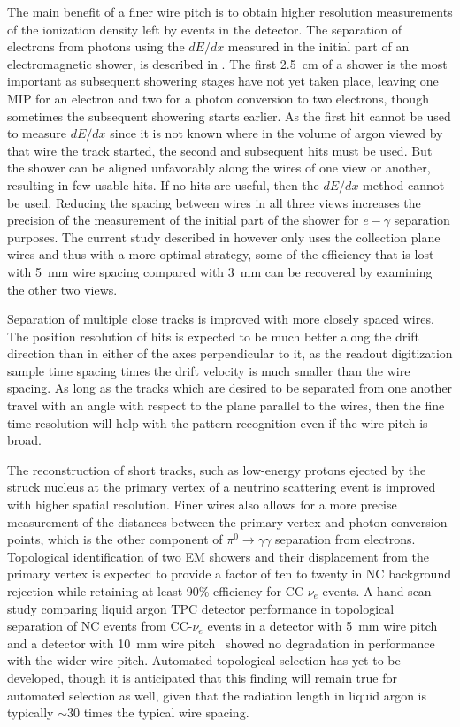 The main benefit of a finer wire pitch is to obtain higher resolution
measurements of the ionization density left by events in the detector.
The separation of electrons from photons using the $dE/dx$ measured in
the initial part of an electromagnetic shower, is described in
\anxreco.  The first 2.5~cm of a shower is the most important as
subsequent showering stages have not yet taken place, leaving one MIP
for an electron and two for a photon conversion to two electrons,
though sometimes the subsequent showering starts earlier.  As the
first hit cannot be used to measure $dE/dx$ since it is not known
where in the volume of argon viewed by that wire the track started,
the second and subsequent hits must be used.  But the shower can be
aligned unfavorably along the wires of one view or another, resulting
in few usable hits.  If no hits are useful, then the $dE/dx$ method
cannot be used.  Reducing the spacing between wires in all three views
increases the precision of the measurement of the initial part of the
shower for $e-\gamma$ separation purposes.  The current study
described in \anxreco however only uses the collection plane wires and
thus with a more optimal strategy, some of the efficiency that is lost
with 5~mm wire spacing compared with 3~mm can be recovered by
examining the other two views.

Separation of multiple close tracks is improved with more closely
spaced wires.  The position resolution of hits is expected to be much
better along the drift direction than in either of the axes
perpendicular to it, as the readout digitization sample time spacing
times the drift velocity is much smaller than the wire spacing.  As
long as the tracks which are desired to be separated from one another
travel with an angle with respect to the plane parallel to the wires,
then the fine time resolution will help with the pattern recognition
even if the wire pitch is broad.

The reconstruction of short tracks, such as low-energy protons ejected
by the struck nucleus at the primary vertex of a neutrino scattering
event is improved with higher spatial resolution.  Finer wires also
allows for a more precise measurement of the distances between the
primary vertex and photon conversion points, which is the other
component of $\pi^0\rightarrow\gamma\gamma$ separation from electrons.
Topological identification of two EM showers and their displacement
from the primary vertex is expected to provide a factor of ten to
twenty in NC background rejection while retaining at least 90\%
efficiency for CC-$\nu_e$ events.  A hand-scan study comparing liquid
argon TPC detector performance in topological separation of NC events
from CC-$\nu_e$ events in a detector with 5~mm wire pitch and a
detector with 10~mm wire pitch~\cite{2008-hand-scan} showed no
degradation in performance with the wider wire pitch.  Automated
topological selection has yet to be developed, though it is
anticipated that this finding will remain true for automated selection
as well, given that the radiation length in liquid argon is typically
$\sim$30 times the typical wire spacing.

